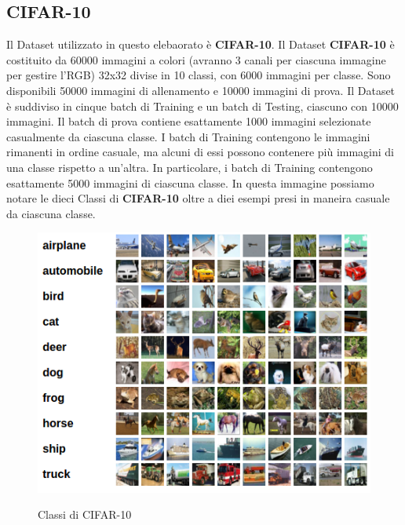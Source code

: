 \subsection{CIFAR-10}
Il Dataset utilizzato in questo elebaorato è \textbf{CIFAR-10}.
Il Dataset \textbf{CIFAR-10} è costituito da 60000 immagini a colori (avranno 3 canali per ciascuna immagine per gestire l'RGB) 32x32 divise in 10 classi, con 6000 immagini per classe. Sono disponibili 50000 immagini di allenamento e 10000 immagini di prova.\newline
Il Dataset è suddiviso in cinque batch di Training e un batch di Testing, ciascuno con 10000 immagini. Il batch di prova contiene esattamente 1000 immagini selezionate casualmente da ciascuna classe. I batch di Training contengono le immagini rimanenti in ordine casuale, ma alcuni di essi possono contenere più immagini di una classe rispetto a un'altra. In  particolare, i batch di Training contengono esattamente 5000 immagini di ciascuna classe.
\newpage
In questa immagine possiamo notare le dieci Classi di \textbf{CIFAR-10} oltre a diei esempi presi in maneira casuale da ciascuna classe.
\begin{figure}[ht]
\centering
\caption{Classi di CIFAR-10}
\includegraphics[width=\linewidth]{CIFAR.png}
\label{figure : CIFAR-10}
\end{figure}

